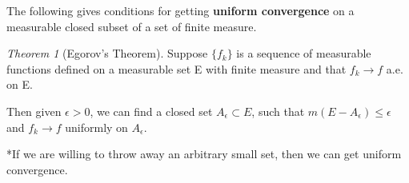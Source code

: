 \documentclass[class=article, crop=false]{standalone}
\theoremstyle{definition}
\theoremstyle{remark}
\theoremstyle{lemma}
\theoremstyle{theorem}
\newtheorem*{theorem}{Theorem}
\theoremstyle{corollary}
\theoremstyle{property}
\begin{document}
			The following gives conditions for getting \textbf{uniform convergence} on a measurable closed subset of a set of finite measure.

			\begin{theorem} [Egorov's Theorem]
			\label{thm:egorovs}
				Suppose $\{f_k\}$ is a sequence of measurable functions defined on a measurable set E with finite measure and that $f_k \rightarrow f$ a.e. on E. 

				Then given $\epsilon > 0$, we can find a closed set $A_\epsilon \subset E$, such that $m(E - A_\epsilon) \le \epsilon$ and $f_k \rightarrow f$ uniformly on $A_\epsilon$.

				*If we are willing to throw away an arbitrary small set, then we can get uniform convergence.
			\end{theorem}
\end{document}
